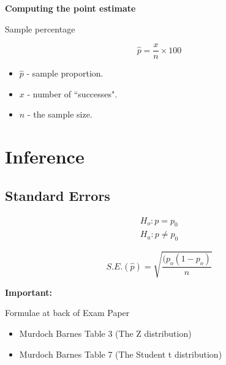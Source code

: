 {{{}



{
\textbf{Computing the point estimate}

Sample percentage

\[
\hat{p} = \frac{x}{n} \times 100%
\]

\begin{itemize}
\item $\hat{p}$ - sample proportion.
\item $x$  - number of ``successes".
\item $n$  - the sample size.
\end{itemize}

}








\section{Inference}

\subsection{Standard Errors}

\begin{eqnarray*}
H_{o}: p = p_{0} \\
H_{a}: p \neq p_{0}
\end{eqnarray*}

\begin{equation}
S.E.(\hat{p})=\sqrt{\frac{(p_{o}(1-p_{o})}{n}}
\end{equation}



\begin{framed}

\textbf{Important:}

Formulae at back of Exam Paper
\begin{itemize}
\item Murdoch Barnes Table 3 (The Z distribution)
\item Murdoch Barnes Table 7 (The Student t distribution)


\end{itemize}
\end{framed}}}
